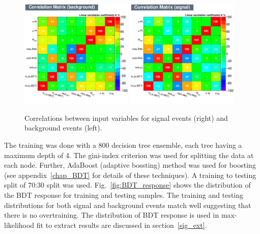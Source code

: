 \begin{figure}[htpb]
\begin{center}
\includegraphics[width=0.48\textwidth]{plots_and_figures/chapter5/CorrelationMatrixB.pdf}
\includegraphics[width=0.48\textwidth]{plots_and_figures/chapter5/CorrelationMatrixS.pdf}\\
\end{center}
\caption{ Correlations between input variables for signal events (right) and background events (left).}
\label{fig:bdt_corr_mat}
\end{figure}

The training was done with a 800 decision tree ensemble, each tree having a maximum depth of 4. The gini-index criterion was used for splitting the data at each node. Further, AdaBoost (adaptive bossting) method was used for boosting (see appendix~\ref{chap_BDT} for details of these techniques). A training to testing split of 70:30 split was used. Fig.~\ref{fig:BDT_response} shows the distribution of the BDT response for training and testing samples. The training and testing distributions for both signal and background events match well suggesting that there is no overtraining. The distribution of BDT response is used in max-likelihood fit to extract results are discussed in section~\ref{sig_ext}.  

